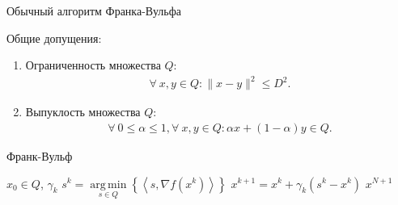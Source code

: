 \documentclass{beamer}
\DeclareMathOperator*{\argmin}{arg\,min}
\begin{document}
\begin{frame}{Обычный алгоритм Франка-Вульфа}

    Общие допущения:
    \begin{enumerate}
        \item Ограниченность множества $Q$:
            \begin{align*}
                \forall\ x, y \in Q: \|x - y\|^2 \leq D^2.
            \end{align*}
        \item Выпуклость множества $Q$:
            \begin{align*}
                \forall\ 0 \leq \alpha \leq 1, \forall\ x, y \in Q: \alpha x + (1-\alpha) y \in Q.
            \end{align*}
    \end{enumerate}

    \begin{algorithm}[H]
        \caption{Франк-Вульф}
        \begin{algorithmic}[1]
             $x_0 \in Q$, $\gamma_k$
                \State $s^k = \argmin\limits_{s \in Q} \left\{ \left<s, \nabla f(x^k) \right> \right\}$
                \State $x^{k+1} = x^k + \gamma_k (s^k - x^k)$
            \EndFor
             $x^{N + 1}$ 
        \end{algorithmic}
    \end{algorithm}

\end{frame}

\end{document}
